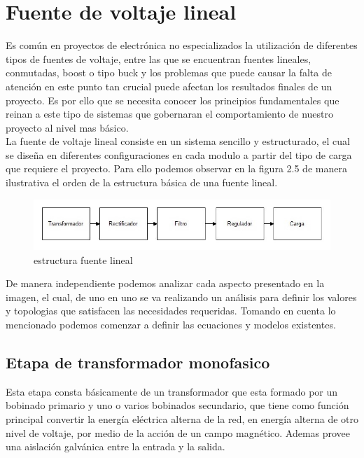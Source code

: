 \newpage
\section{Fuente de voltaje lineal}
Es común en proyectos de electrónica no especializados la utilización de diferentes tipos de fuentes de voltaje, entre las que se encuentran fuentes lineales, conmutadas, boost o tipo buck y los problemas que puede causar la falta de atención en este punto tan crucial puede afectan los resultados finales de un proyecto. Es por ello que se necesita conocer los principios fundamentales que reinan a este tipo de sistemas que gobernaran el comportamiento de nuestro proyecto al nivel mas básico.\\

La fuente de voltaje lineal consiste en un sistema sencillo y estructurado, el cual se diseña en diferentes configuraciones en cada modulo a partir del tipo de carga que requiere el proyecto. Para ello podemos observar en la figura 2.5 de manera ilustrativa el orden de la estructura básica de una fuente lineal.

\begin{figure}[H]
 \centering
 \includegraphics[width=12cm]{capitulo2/figs/fuentelineal.jpg}
 \caption{estructura fuente lineal}
 \end{figure}
 
 De manera independiente podemos analizar cada aspecto presentado en la imagen, el cual, de uno en uno se va realizando un análisis para definir los valores y topologias que satisfacen las necesidades requeridas. Tomando en cuenta lo mencionado podemos comenzar a definir las ecuaciones y modelos existentes.

\subsection{Etapa de transformador monofasico}

Esta etapa consta básicamente de un transformador que esta formado por un bobinado primario y uno o varios bobinados secundario, que tiene como función principal
convertir la energía eléctrica alterna de la red, en energía alterna de otro nivel de voltaje, por medio de la acción de un campo magnético. Ademas provee una aislación galvánica entre la entrada y la salida.\\

